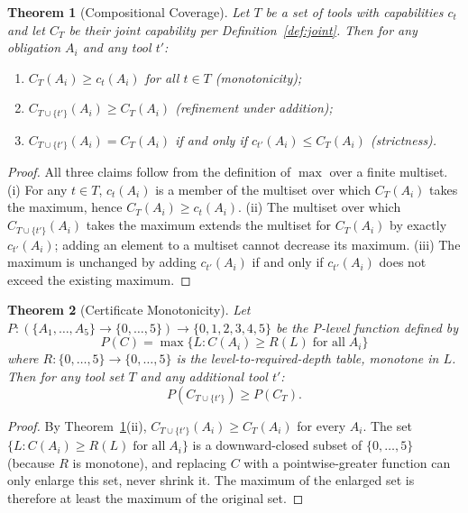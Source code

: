 \documentclass[11pt,a4paper]{article}
\newtheorem{theorem}{Theorem}
\begin{document}
\begin{theorem}[Compositional Coverage]\label{thm:compositional-coverage}
Let $T$ be a set of tools with capabilities $c_t$ and let $C_T$ be their joint capability per Definition~\ref{def:joint}. Then for any obligation $A_i$ and any tool $t'$:
\begin{enumerate}[label=(\roman*)]
\item $C_T(A_i) \geq c_t(A_i)$ for all $t \in T$ \hfill (monotonicity);
\item $C_{T \cup \{t'\}}(A_i) \geq C_T(A_i)$ \hfill (refinement under addition);
\item $C_{T \cup \{t'\}}(A_i) = C_T(A_i)$ if and only if $c_{t'}(A_i) \leq C_T(A_i)$ \hfill (strictness).
\end{enumerate}
\end{theorem}

\begin{proof}
All three claims follow from the definition of $\max$ over a finite multiset.
(i) For any $t \in T$, $c_t(A_i)$ is a member of the multiset over which $C_T(A_i)$ takes the maximum, hence $C_T(A_i) \geq c_t(A_i)$.
(ii) The multiset over which $C_{T \cup \{t'\}}(A_i)$ takes the maximum extends the multiset for $C_T(A_i)$ by exactly $c_{t'}(A_i)$; adding an element to a multiset cannot decrease its maximum.
(iii) The maximum is unchanged by adding $c_{t'}(A_i)$ if and only if $c_{t'}(A_i)$ does not exceed the existing maximum.
\end{proof}

\begin{theorem}[Certificate Monotonicity]\label{thm:certificate-monotonicity}
Let $P : (\{A_1, \ldots, A_5\} \to \{0, \ldots, 5\}) \to \{0, 1, 2, 3, 4, 5\}$ be the P-level function defined by
\[
  P(C) = \max\{L : C(A_i) \geq R(L) \;\text{for all}\; A_i\}
\]
where $R : \{0, \ldots, 5\} \to \{0, \ldots, 5\}$ is the level-to-required-depth table, monotone in $L$. Then for any tool set $T$ and any additional tool $t'$:
\[
  P(C_{T \cup \{t'\}}) \geq P(C_T).
\]
\end{theorem}

\begin{proof}
By Theorem~\ref{thm:compositional-coverage}(ii), $C_{T \cup \{t'\}}(A_i) \geq C_T(A_i)$ for every $A_i$. The set $\{L : C(A_i) \geq R(L) \;\text{for all}\; A_i\}$ is a downward-closed subset of $\{0, \ldots, 5\}$ (because $R$ is monotone), and replacing $C$ with a pointwise-greater function can only enlarge this set, never shrink it. The maximum of the enlarged set is therefore at least the maximum of the original set.
\end{proof}
\end{document}
